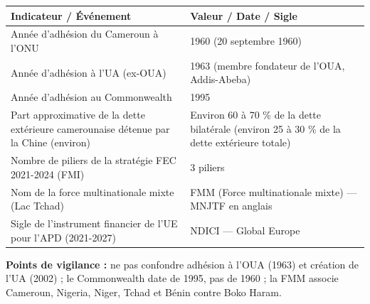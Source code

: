 \documentclass[11pt]{article}
\begin{document}
\begin{corrige}
\begin{center}
\begin{tabularx}{\linewidth}{|l|X|}\hline
\rowcolor{popblueL}
\textbf{Indicateur / Événement} & \textbf{Valeur / Date / Sigle} \\ \hline
Année d'adhésion du Cameroun à l'ONU & 1960 (20 septembre 1960) \\ \hline
Année d'adhésion à l'UA (ex-OUA) & 1963 (membre fondateur de l'OUA, Addis-Abeba) \\ \hline
Année d'adhésion au Commonwealth & 1995 \\ \hline
Part approximative de la dette extérieure camerounaise détenue par la Chine (environ) & Environ 60 à 70 \% de la dette bilatérale (environ 25 à 30 \% de la dette extérieure totale) \\ \hline
Nombre de piliers de la stratégie FEC 2021-2024 (FMI) & 3 piliers \\ \hline
Nom de la force multinationale mixte (Lac Tchad) & FMM (Force multinationale mixte) — MNJTF en anglais \\ \hline
Sigle de l'instrument financier de l'UE pour l'APD (2021-2027) & NDICI — Global Europe \\ \hline
\end{tabularx}
\end{center}
\textbf{Points de vigilance :} ne pas confondre adhésion à l'OUA (1963) et création de l'UA (2002) ; le Commonwealth date de 1995, pas de 1960 ; la FMM associe Cameroun, Nigeria, Niger, Tchad et Bénin contre Boko Haram.
\end{corrige}
\end{document}
